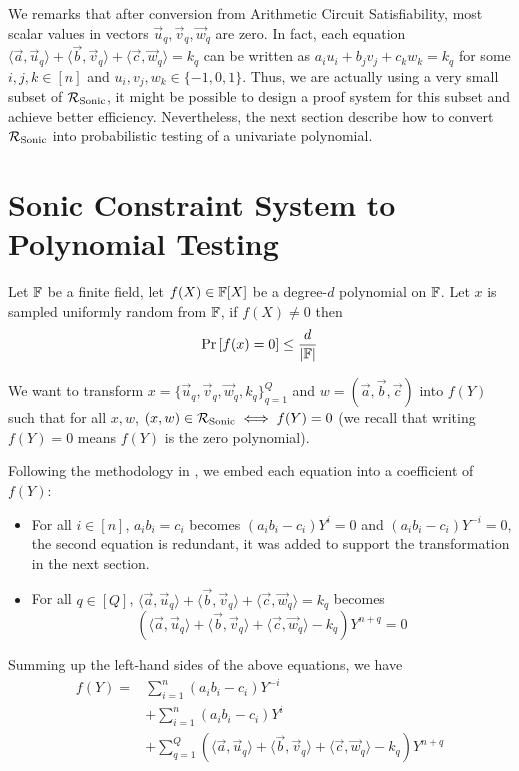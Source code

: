 We remarks that after conversion from Arithmetic Circuit Satisfiability, most scalar values in vectors $\Vec{u}_q, \Vec{v}_q, \Vec{w}_q$ are zero. In fact, each equation $\langle \Vec{a}, \Vec{u}_q \rangle + \langle \Vec{b}, \Vec{v}_q \rangle + \langle \Vec{c}, \Vec{w}_q \rangle = k_q$ can be written as $a_i u_i + b_j  v_j + c_k w_k = k_q$ for some $i, j, k \in [n]$ and $u_i, v_j, w_k \in \{-1, 0, 1\}$. Thus, we are actually using a very small subset of $\mathcal{R}_{\mathrm{Sonic}}$, it might be possible to design a proof system for this subset and achieve better efficiency.
Nevertheless, the next section describe how to convert $\mathcal{R}_{\mathrm{Sonic}}$ into probabilistic testing of a univariate polynomial.

\section{Sonic Constraint System to Polynomial Testing}

\begin{lemma}
Let $\mathbb{F}$ be a finite field, let $f(X) \in \mathbb{F}[X]$ be a degree-$d$ polynomial on $\mathbb{F}$. Let $x$ is sampled uniformly random from $\mathbb{F}$, if $f(X) \ne 0$ then
$$\mathrm{Pr} \left[ f(x) = 0 \right] \le \frac{d}{|\mathbb{F}|}$$
\end{lemma}

We want to transform $x = \{ \Vec{u}_q, \Vec{v}_q, \Vec{w}_q, k_q \}_{q=1}^{Q}$ and $w = (\Vec{a}, \Vec{b}, \Vec{c})$ into $f(Y)$ such that for all $x, w$, $(x, w) \in \mathcal{R}_{\mathrm{Sonic}} \iff f(Y) = 0$ (we recall that writing $f(Y) = 0$ means $f(Y)$ is the zero polynomial).

Following the methodology in \cite{maller2019sonic}, we embed each equation into a coefficient of $f(Y)$:
\begin{itemize}
    \item For all $i \in [n]$, $a_i b_i = c_i$ becomes $(a_i b_i - c_i) Y^i = 0$ and $(a_i b_i - c_i) Y^{-i} = 0$, the second equation is redundant, it was added to support the transformation in the next section.
    \item For all $q \in [Q]$, $\langle \Vec{a}, \Vec{u}_q \rangle
      + \langle \Vec{b}, \Vec{v}_q \rangle
      + \langle \Vec{c}, \Vec{w}_q \rangle
      = k_q$ becomes $$(\langle \Vec{a}, \Vec{u}_q \rangle
      + \langle \Vec{b}, \Vec{v}_q \rangle
      + \langle \Vec{c}, \Vec{w}_q \rangle
      - k_q) Y^{n + q} = 0$$
\end{itemize}

Summing up the left-hand sides of the above equations, we have
\begin{align*}
f(Y) = & \sum_{i=1}^{n}(a_i b_i - c_i) Y^{-i} \\
& + \sum_{i=1}^{n}(a_i b_i - c_i) Y^i \\
& + \sum_{q=1}^{Q} (\langle \Vec{a}, \Vec{u}_q \rangle
      + \langle \Vec{b}, \Vec{v}_q \rangle
      + \langle \Vec{c}, \Vec{w}_q \rangle
      - k_q) Y^{n + q}
\end{align*}

